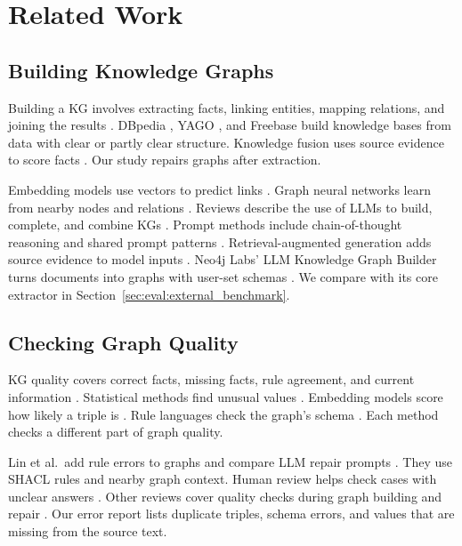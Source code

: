 \section{Related Work}
\label{sec:related_work}

\subsection{Building Knowledge Graphs}

Building a KG involves extracting facts, linking entities, mapping relations,
and joining the results \citep{ref_ji2021}. DBpedia \citep{ref_auer2007},
YAGO \citep{ref_suchanek2007}, and Freebase \citep{ref_bollacker2008} build
knowledge bases from data with clear or partly clear structure.
Knowledge fusion uses source evidence to score facts \citep{ref_dong2014}.
Our study repairs graphs after extraction.

Embedding models use vectors to predict links
\citep{ref_bordes2013,ref_wang2017}. Graph neural networks learn from nearby
nodes and relations \citep{ref_schlichtkrull2018}. Reviews describe the use
of LLMs to build, complete, and combine KGs
\citep{ref_pan2023,ref_pan2025,ref_bian2025}. Prompt methods include
chain-of-thought reasoning \citep{ref_wei2023} and shared prompt patterns
\citep{ref_white2023}. Retrieval-augmented generation adds source evidence
to model inputs \citep{ref_lewis2020}. Neo4j Labs' LLM Knowledge Graph
Builder turns documents into graphs with user-set schemas
\citep{ref_neo4j_llm_graph_builder}. We compare with its core extractor in
Section~\ref{sec:eval:external_benchmark}.

\subsection{Checking Graph Quality}

KG quality covers correct facts, missing facts, rule agreement, and current
information \citep{ref_zaveri2016,ref_paulheim2017}. Statistical methods
find unusual values \citep{ref_wienand2014,ref_paulheim2014}.
Embedding models score how likely a triple is \citep{ref_nickel2016}.
Rule languages check the graph's schema \citep{ref_kontokostas2014}.
Each method checks a different part of graph quality.

Lin et al.\ add rule errors to graphs and compare LLM repair prompts
\citep{ref_lin2025}. They use SHACL rules and nearby graph context.
Human review helps check cases with unclear answers \citep{ref_acosta2013}.
Other reviews cover quality checks during graph building and repair
\citep{ref_wang2021,ref_paulheim2017}. Our error report lists duplicate
triples, schema errors, and values that are missing from the source text.

